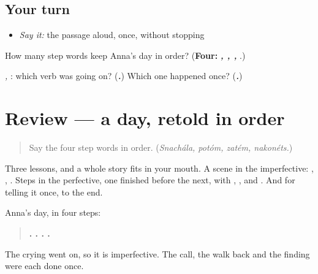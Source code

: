 \subsection*{Your turn}
\begin{itemize}
\raggedright
  \item \emph{Say it:} the passage aloud, once, without stopping
\end{itemize}

\begin{tcolorbox}[breakable,colback=teal!4,colframe=teal!35!black,title={Before you move on}]
How many step words keep Anna's day in order? (\textbf{Four:} \emph{\textbf{, , , }}.)

\emph{  ,   }: which verb was going on? (\emph{\textbf{.}}) Which one happened once? (\emph{\textbf{.}})
\end{tcolorbox}
\section[(review)]{Review — a day, retold in order}

\label{lesson:RU-C262-review}



\begin{quote}
Say the four step words in order. (\emph{Snachála, potóm, zatém, nakonéts.})
\end{quote}

\begin{grammarlens}[title={What you've built}]
Three lessons, and a whole story fits in your mouth. A scene in the imperfective: \emph{}, \emph{ }, \emph{}. Steps in the perfective, one finished before the next, with \textbf{}, \textbf{}, \textbf{} and \textbf{}. And \textbf{} for telling it once, to the end.

Anna's day, in four steps:

\begin{quote}
\textbf{  .     .     .    .}
\end{quote}

The crying went on, so it is imperfective. The call, the walk back and the finding were each done once.
\end{grammarlens}

